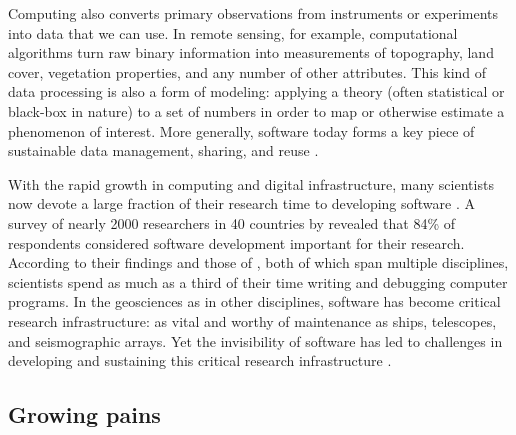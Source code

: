 \documentclass[12pt]{amsart}
\begin{document}
Computing also converts primary observations from instruments or experiments into data that we can use. In remote sensing, for example, computational algorithms turn raw binary information into measurements of topography, land cover, vegetation properties, and any number of other attributes. This kind of data processing is also a form of modeling: applying a theory (often statistical or black-box in nature) to a set of numbers in order to map or otherwise estimate a phenomenon of interest. More generally, software today forms a key piece of sustainable data management, sharing, and reuse \citep[e.g.,][]{hsu2015data}.

With the rapid growth in computing and digital infrastructure, many scientists now devote a large fraction of their research time to developing software \citep{hannay2009scientists,prabhu2011survey,wilson2014best,singh2016unsung,pinto2018scientists}. A survey of nearly 2000 researchers in 40 countries by \citet{hannay2009scientists} revealed that 84\% of respondents considered software development important for their research. According to their findings and those of \citet{prabhu2011survey}, both of which span multiple disciplines, scientists spend as much as a third of their time writing and debugging computer programs. In the geosciences as in other disciplines, software has become critical research infrastructure: as vital and worthy of maintenance as ships, telescopes, and seismographic arrays. Yet the invisibility of software  has led to challenges in developing and sustaining this critical research infrastructure \citep{eghbal2016roads}.


\subsection{Growing pains}
\end{document}
